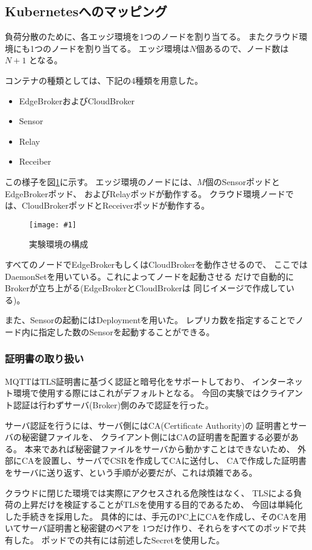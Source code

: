 \documentclass[submit,techrep]{ipsj}
\newcommand{\reffig}[1]{図\ref{#1}}
\newcommand{\epsfig}[4]{
\begin{figure}[tb]
  \begin{center}
    \texttt{[image: \#1]}
  \end{center}
  \caption{#3}
  \label{#4}
\end{figure}}
\newcommand{\kbs}{Kubernetes}
\begin{document}
\subsection{\kbs へのマッピング}

負荷分散のために、各エッジ環境を1つのノードを割り当てる。
またクラウド環境にも1つのノードを割り当てる。
エッジ環境は$N$個あるので、ノード数は $N+1$ となる。

コンテナの種類としては、下記の4種類を用意した。
\begin{itemize}
  \item EdgeBrokerおよびCloudBroker
  \item Sensor 
  \item Relay
  \item Receiber
\end{itemize}

この様子を\reffig{setup}に示す。
エッジ環境のノードには、$M$個のSensorポッドとEdgeBrokerポッド、
およびRelayポッドが動作する。
クラウド環境ノードでは、CloudBrokerポッドとReceiverポッドが動作する。

\epsfig{figs/experimental-setup.pdf}{width=8.5cm}{実験環境の構成}{setup}

すべてのノードでEdgeBrokerもしくはCloudBrokerを動作させるので、
ここではDaemonSetを用いている。これによってノードを起動させる
だけで自動的にBrokerが立ち上がる(EdgeBrokerとCloudBrokerは
同じイメージで作成している)。

また、Sensorの起動にはDeploymentを用いた。
レプリカ数を指定することでノード内に指定した数のSensorを起動することができる。


\subsubsection{証明書の取り扱い}
MQTTはTLS証明書に基づく認証と暗号化をサポートしており、
インターネット環境で使用する際にはこれがデフォルトとなる。
今回の実験ではクライアント認証は行わずサーバ(Broker)側のみで認証を行った。

サーバ認証を行うには、サーバ側にはCA(Certificate Authority)の
証明書とサーバの秘密鍵ファイルを、
クライアント側にはCAの証明書を配置する必要がある。
本来であれば秘密鍵ファイルをサーバから動かすことはできないため、
外部にCAを設置し、サーバでCSRを作成してCAに送付し、
CAで作成した証明書をサーバに送り返す、という手順が必要だが、これは煩雑である。

クラウドに閉じた環境では実際にアクセスされる危険性はなく、
TLSによる負荷の上昇だけを検証することがTLSを使用する目的であるため、
今回は単純化した手続きを採用した。
具体的には、手元のPC上にCAを作成し、そのCAを用いてサーバ証明書と秘密鍵のペアを
1つだけ作り、それらをすべてのポッドで共有した。
ポッドでの共有には前述したSecretを使用した。
\end{document}
